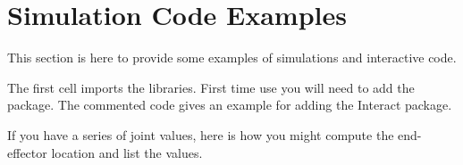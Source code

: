 \hypertarget{simulation-code-examples}{%
\section{Simulation Code Examples}\label{simulation-code-examples}}

This section is here to provide some examples of simulations and
interactive code.

The first cell imports the libraries. First time use you will need to
add the package. The commented code gives an example for adding the
Interact package.

\begin{Shaded}
\begin{Highlighting}[]

\end{Highlighting}
\end{Shaded}

If you have a series of joint values, here is how you might compute the
end-effector location and list the values.

\begin{Shaded}
\begin{Highlighting}[]
\OperatorTok{,}\OperatorTok{=} \OperatorTok{,} 
 \OperatorTok{=}\OperatorTok{/}\OperatorTok{,}\OperatorTok{/}\OperatorTok{,}\OperatorTok{=} \NormalTok{)}
 \OperatorTok{=}\OperatorTok{/}\OperatorTok{,}\OperatorTok{/}\OperatorTok{,}\OperatorTok{=} \NormalTok{)}
 \OperatorTok{:}
\OperatorTok{=}\OperatorTok{*}\NormalTok{[i]}\OperatorTok{+}\NormalTok{[i]) }\OperatorTok{+}\OperatorTok{*}\NormalTok{[i])}
\OperatorTok{=}\OperatorTok{*}\NormalTok{[i]}\OperatorTok{+}\NormalTok{[i]) }\OperatorTok{+}\OperatorTok{*}\NormalTok{[i])}
\OperatorTok{,}\OperatorTok{,} \OperatorTok{,}
\end{Highlighting}
\end{Shaded}

